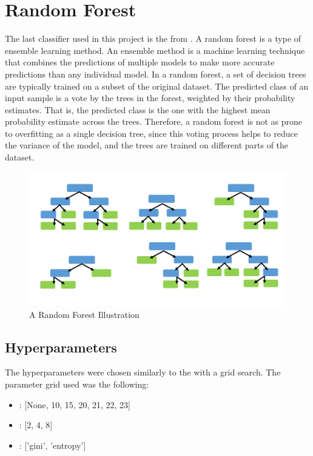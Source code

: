 \section{Random Forest}
The last classifier used in this project is the  from .
A random forest is a type of ensemble learning method.
An ensemble method is a machine learning technique that combines the predictions of multiple models to make more accurate predictions than any individual model. %
In a random forest, a set of decision trees are typically trained on a subset of the original dataset.
The predicted class of an input sample is a vote by the trees in the forest, weighted by their probability estimates.
That is, the predicted class is the one with the highest mean probability estimate across the trees.
Therefore, a random forest is not as prone to overfitting as a single decision tree, since this voting process helps to reduce the variance of the model, and the trees are trained on different parts of the dataset.

\begin{figure}[H]
    \centering
    \includegraphics[scale=0.3]{figures_for_report/random_forest_simple_example}
    \captionsetup{justification=centering,margin=2cm}
    \caption{A Random Forest Illustration}\label{fig:figure}
\end{figure}


\subsection{Hyperparameters}\label{subsec:hyperparameters}
The hyperparameters were chosen similarly to the  with a grid search.
The parameter grid used was the following:\\

\begin{center}
    \begin{minipage}{4in}
\begin{itemize}
    \item {}: [None, 10, 15, 20, 21, 22, 23]
    \item {}: [2, 4, 8]
    \item {}: ['gini', 'entropy'] \\
\end{itemize}
            \end{minipage}
\end{center}

